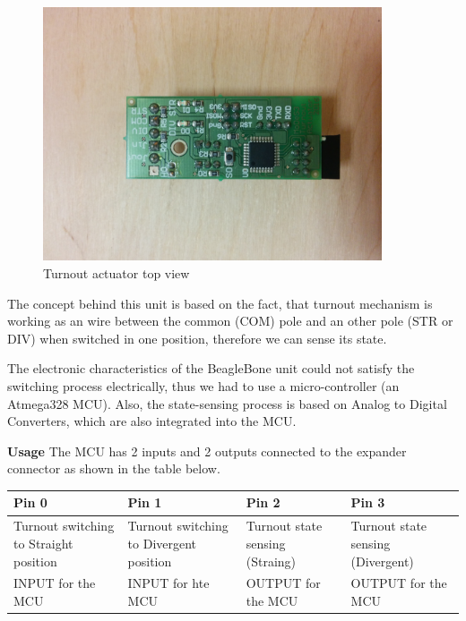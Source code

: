 \begin{figure}[!ht]
	\centering
	\includegraphics[width=100mm]{figures/modes3/turnout-top.jpg}
	\caption{Turnout actuator top view}
	\label{fig:turnoutTop}
\end{figure}

The concept behind this unit is based on the fact, that turnout mechanism is working as an wire between the common (COM) pole and an other pole (STR or DIV) when switched in one position, therefore we can sense its state.

The electronic characteristics of the BeagleBone unit could not satisfy the switching process electrically, thus we had to use a micro-controller (an Atmega328 MCU). Also, the state-sensing process is based on Analog to Digital Converters, which are also integrated into the MCU.

\textbf{Usage}
The MCU has 2 inputs and 2 outputs connected to the expander connector as shown in the table below.
\begin{center}
	\renewcommand{\arraystretch}{1.5}
	\begin{tabu} to 1.0\textwidth {X[c] X[c] X[c] X[c]}
		\toprule
		Pin 0                                  & Pin 1                                   & Pin 2                           & Pin 3                             \\ \midrule
		Turnout switching to Straight position & Turnout switching to Divergent position & Turnout state sensing (Straing) & Turnout state sensing (Divergent) \\
		INPUT for the MCU                      & INPUT for hte MCU                       & OUTPUT for the MCU              & OUTPUT for the MCU                \\ \bottomrule
	\end{tabu}
\end{center}


